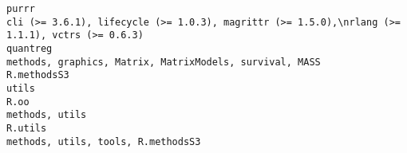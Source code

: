 \documentclass[
  letterpaper,
  DIV=11,
  numbers=noendperiod]{scrreprt}
\begin{document}
\begin{verbatim}
purrr                                                                                                                                                                                                                                                                                                                                                                                                                                                                                                                       cli (>= 3.6.1), lifecycle (>= 1.0.3), magrittr (>= 1.5.0),\nrlang (>= 1.1.1), vctrs (>= 0.6.3)
quantreg                                                                                                                                                                                                                                                                                                                                                                                                                                                                                                                                                           methods, graphics, Matrix, MatrixModels, survival, MASS
R.methodsS3                                                                                                                                                                                                                                                                                                                                                                                                                                                                                                                                                                                                          utils
R.oo                                                                                                                                                                                                                                                                                                                                                                                                                                                                                                                                                                                                        methods, utils
R.utils                                                                                                                                                                                                                                                                                                                                                                                                                                                                                                                                                                                 methods, utils, tools, R.methodsS3

\end{verbatim}
\end{document}
